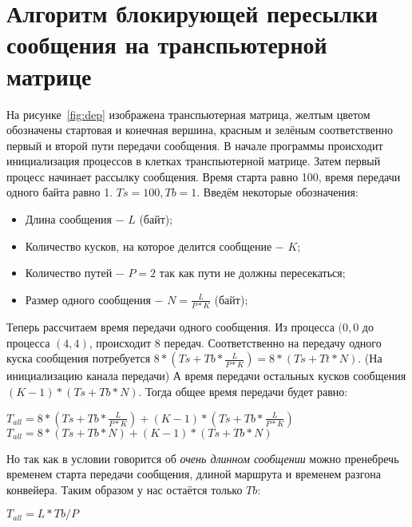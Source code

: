 \documentclass[a4peper, 12pt, titlepage, finall]{extreport}
\begin{document}
    \section{Алгоритм блокирующей пересылки сообщения на транспьютерной матрице}
        На рисунке~\ref{fig:dep} изображена транспьютерная матрица, желтым цветом обозначены стартовая и конечная вершина, красным и зелёным соответственно первый и второй пути передачи сообщения.
        В начале программы происходит инициализация процессов в клетках транспьютерной матрице. Затем первый процесс начинает рассылку сообщения. 
        Время старта равно 100, время передачи одного байта равно 1. \(Ts = 100, Tb = 1\).
        Введём некоторые обозначения:
        \begin{itemize}
            \item Длина сообщения $-$ \(L\) (байт);
            \item Количество кусков, на которое делится сообщение $-$ \(K\);
            \item Количество путей $-$ \(P = 2\) так как пути не должны пересекаться;
            \item Размер одного сообщения $-$ \(N = \frac{L}{P * K}\) (байт);
        \end{itemize}

        Теперь рассчитаем время передачи одного сообщения. Из процесса \((0, 0\) до процесса \((4, 4)\), происходит \(8\) передач. 
        Соответственно на передачу одного куска сообщения потребуется \(8 * (Ts + Tb * \frac{L}{P * K}) = 8 * (Ts + Tt * N)\).
        (На инициализацию канала передачи)
        А время передачи остальных кусков сообщения \((K - 1) * (Ts + Tb * N)\).
        Тогда общее время передачи будет равно:\\
        \begin{center}
            $T_{all} = 8 * (Ts + Tb * \frac{L}{P * K}) + (K - 1) * (Ts + Tb * \frac{L}{P * K})$\\
            $T_{all} = 8 * (Ts + Tb * N) + (K - 1) * (Ts + Tb * N)$
        \end{center}

        Но так как в условии говорится об \textit{очень длинном сообщении} можно пренебречь временем старта передачи сообщения, длиной маршрута и временем разгона конвейера.
        Таким образом у нас остаётся только \(Tb\):
        \begin{center}
            $T_{all} = L * Tb / P$
        \end{center}
\end{document}
